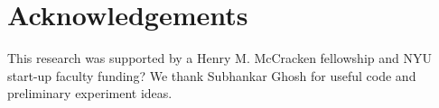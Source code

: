 \section{Acknowledgements}

This research was supported by a Henry M. McCracken fellowship and NYU
start-up faculty funding? We thank Subhankar Ghosh for useful code and
preliminary experiment ideas.